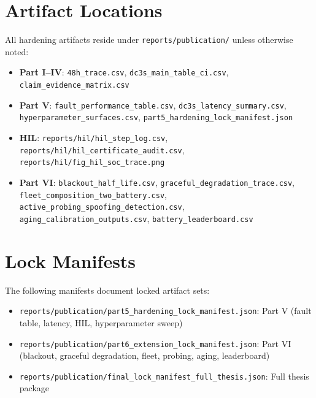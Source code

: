\section{Artifact Locations}

All hardening artifacts reside under \texttt{reports/publication/} unless otherwise noted:

\begin{itemize}
\item \textbf{Part I--IV}: \texttt{48h\_trace.csv}, \texttt{dc3s\_main\_table\_ci.csv}, \texttt{claim\_evidence\_matrix.csv}
\item \textbf{Part V}: \texttt{fault\_performance\_table.csv}, \texttt{dc3s\_latency\_summary.csv}, \texttt{hyperparameter\_surfaces.csv}, \texttt{part5\_hardening\_lock\_manifest.json}
\item \textbf{HIL}: \texttt{reports/hil/hil\_step\_log.csv}, \texttt{reports/hil/hil\_certificate\_audit.csv}, \texttt{reports/hil/fig\_hil\_soc\_trace.png}
\item \textbf{Part VI}: \texttt{blackout\_half\_life.csv}, \texttt{graceful\_degradation\_trace.csv}, \texttt{fleet\_composition\_two\_battery.csv}, \texttt{active\_probing\_spoofing\_detection.csv}, \texttt{aging\_calibration\_outputs.csv}, \texttt{battery\_leaderboard.csv}
\end{itemize}

\section{Lock Manifests}

The following manifests document locked artifact sets:

\begin{itemize}
\item \texttt{reports/publication/part5\_hardening\_lock\_manifest.json}: Part V (fault table, latency, HIL, hyperparameter sweep)
\item \texttt{reports/publication/part6\_extension\_lock\_manifest.json}: Part VI (blackout, graceful degradation, fleet, probing, aging, leaderboard)
\item \texttt{reports/publication/final\_lock\_manifest\_full\_thesis.json}: Full thesis package
\end{itemize}

